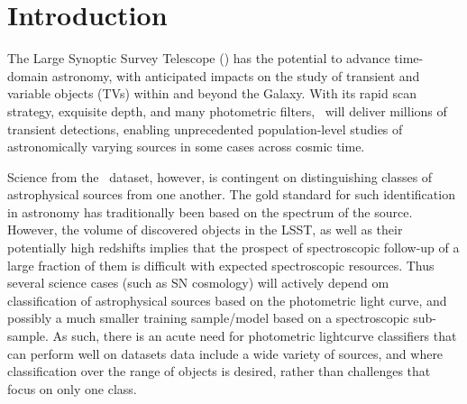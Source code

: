 \section{Introduction}
\label{sec:intro}

The Large Synoptic Survey Telescope (\lsst) has the potential to advance time-domain astronomy, with anticipated impacts on the study of transient and variable objects (TVs) within and beyond the Galaxy.
With its rapid scan strategy, exquisite depth, and many photometric filters, \lsst\ will deliver millions of transient detections, enabling unprecedented population-level studies of astronomically varying sources in some cases across cosmic time.

Science from the \lsst\ dataset, however, is contingent on distinguishing classes of astrophysical sources
 from one another. The gold standard for such identification in astronomy has traditionally been
based on the spectrum of the source. However, the volume of discovered objects in the LSST, as well as their potentially high redshifts implies that the prospect of spectroscopic follow-up of a large fraction of them is difficult
with expected spectroscopic resources. Thus several science cases (such as SN cosmology) will actively depend om classification of astrophysical sources based on the photometric light curve, and possibly a much smaller training sample/model based on a spectroscopic sub-sample.
As such, there is an acute need for photometric lightcurve classifiers that can perform well on datasets data include a wide variety of sources, and where classification over the range of objects is desired, rather than challenges that focus on only one class.

